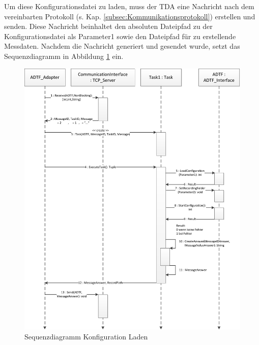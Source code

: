 \documentclass[12pt,a4paper]{report}
\begin{document}
Um diese Konfigurationsdatei zu laden, muss der TDA eine Nachricht nach dem vereinbarten Protokoll (s. Kap. \ref{subsec:Kommunikationsprotokoll}) erstellen und senden. Diese Nachricht beinhaltet den absoluten Dateipfad zu der Konfigurationsdatei als Parameter1 sowie den Dateipfad für zu erstellende Messdaten. Nachdem die Nachricht generiert und gesendet wurde, setzt das Sequenzdiagramm in Abbildung \ref{pic:Sequenz Load Config} ein.
\begin{figure}
\begin{center}
\includegraphics[scale=0.85]{Darstellungen/SequenzLoadConfig}
\caption{Sequenzdiagramm Konfiguration Laden}\label{pic:Sequenz Load Config}
\end{center}
\end{figure}
\end{document}
